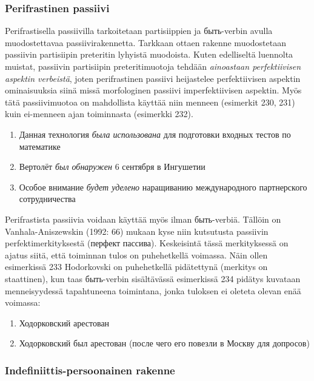 \documentclass[]{scrartcl}
\providecommand{\tightlist}{%
  \setlength{\itemsep}{0pt}\setlength{\parskip}{0pt}}
\begin{document}
\subsubsection{Perifrastinen passiivi}\label{perifrastinen-passiivi}

Perifrastisella passiivilla tarkoitetaan partisiippien ja быть-verbin
avulla muodostettavaa passiivirakennetta. Tarkkaan ottaen rakenne
muodostetaan passiivin partisiipin preteritin lyhyistä muodoista. Kuten
edelliseltä luennolta muistat, passiivin partisiipin preteritimuotoja
tehdään \emph{ainoastaan perfektiivisen aspektin verbeistä}, joten
perifrastinen passiivi heijastelee perfektiivisen aspektin ominaisuuksia
siinä missä morfologinen passiivi imperfektiivisen aspektin. Myös tätä
passiivimuotoa on mahdollista käyttää niin menneen (esimerkit 230, 231)
kuin ei-menneen ajan toiminnasta (esimerkki 232).

\begin{enumerate}
\def\labelenumi{(\arabic{enumi})}
\setcounter{enumi}{229}
\tightlist
\item
  Данная технология \emph{была использована} для подготовки входных
  тестов по математике
\item
  Вертолёт \emph{был обнаружен} 6 сентября в Ингушетии
\item
  Особое внимание \emph{будет уделено} наращиванию международного
  партнерского сотрудничества
\end{enumerate}

Perifrastista passiivia voidaan käyttää myös ilman быть-verbiä. Tällöin
on Vanhala-Aniszewskin (1992: 66) mukaan kyse niin kutsutusta passiivin
perfektimerkityksestä (перфект пассива). Keskeisintä tässä merkityksessä
on ajatus siitä, että toiminnan tulos on puhehetkellä voimassa. Näin
ollen esimerkissä 233 Hodorkovski on puhehetkellä pidätettynä (merkitys
on staattinen), kun taas быть-verbin sisältävässä esimerkissä 234
pidätys kuvataan menneisyydessä tapahtuneena toimintana, jonka tuloksen
ei oleteta olevan enää voimassa:

\begin{enumerate}
\def\labelenumi{(\arabic{enumi})}
\setcounter{enumi}{232}
\tightlist
\item
  Ходорковский арестован
\item
  Ходорковский был арестован (после чего его повезли в Москву для
  допросов)
\end{enumerate}

\subsubsection{Indefiniittis-persoonainen
rakenne}\label{indefiniittis-persoonainen-rakenne}
\end{document}
